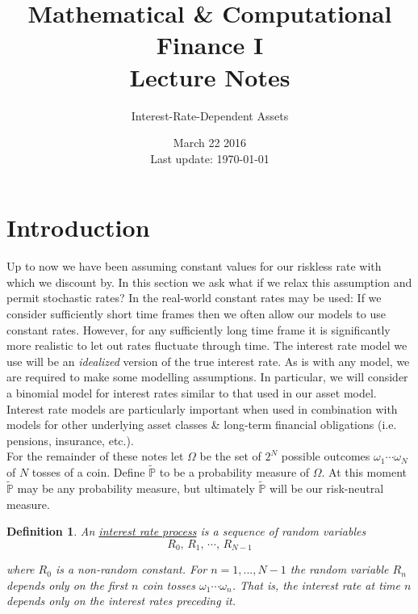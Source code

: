 \documentclass[12pt]{article}
\newtheorem{definition}{Definition}
\newlength\tindent
\renewcommand{\indent}{\hspace*{\tindent}}
\renewcommand{\P}{\mathbb P}
\begin{document}
 
 
\title{Mathematical \& Computational Finance I\\Lecture Notes}
\author{Interest-Rate-Dependent Assets}
\date{March 22 2016 \\ Last update: \today{}}
\maketitle

\section{Introduction}

\indent Up to now we have been assuming constant values for our riskless rate with which we discount by. In this section we ask what if we relax this assumption and permit stochastic rates? In the real-world constant rates may be used: If we consider sufficiently short time frames then we often allow our models to use constant rates. However, for any sufficiently long time frame it is significantly more realistic to let out rates fluctuate through time. The interest rate model we use will be an {\em idealized} version of the true interest rate. As is with any model, we are required to make some modelling assumptions. In particular, we will consider a binomial model for interest rates similar to that used in our asset model. \\

\indent Interest rate models are particularly important when used in combination with models for other underlying asset classes \& long-term financial obligations (i.e. pensions, insurance, etc.). \\

\indent For the remainder of these notes let $\Omega$ be the set of $2^N$ possible outcomes $\omega_1\cdots\omega_N$ of $N$ tosses of a coin. Define $\tilde{\P}$ to be a probability measure of $\Omega$. At this moment $\tilde{\P}$ may be any probability measure, but ultimately $\tilde{\P}$ will be our risk-neutral measure.  \\

\begin{definition} An \underline{interest rate process} is a sequence of random variables
\begin{equation*}
	R_0,\,R_1,\, \cdots,\, R_{N - 1}
\end{equation*}

where $R_0$ is a non-random constant. For $n = 1,...,N - 1$ the random variable $R_n$ depends only on the first $n$ coin tosses $\omega_1\cdots\omega_n$. That is, the interest rate at time $n$ depends only on the interest rates preceding it.
\end{definition} \hfill\\
\end{document}
